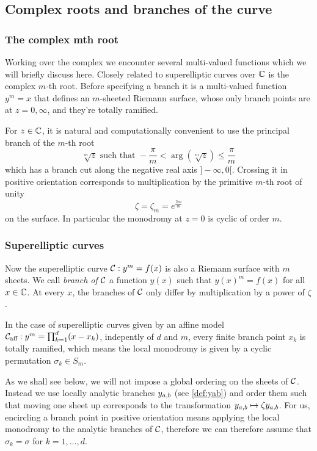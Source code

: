 \documentclass[main.tex]{subfiles}
\begin{document}
  \subsection{Complex roots and branches of the curve}\label{subsec:roots_branches}

  \subsubsection{The complex mth root}

  Working over the complex we encounter several multi-valued functions
  which we will briefly discuss here.  Closely related to superelliptic
  curves over $\mathbb{C}$ is the complex $m$-th root.
  Before specifying a branch it is a multi-valued function $y^m = x$
  that defines an $m$-sheeted Riemann surface, whose only branch points
  are at $z = 0,\infty$, and they're totally ramified.

  For $z\in\mathbb{C}$, it is natural and computationally convenient to use the
  principal branch of the $m$-th root
  \begin{equation}
      \sqrt[m]z \text{ such that } -\frac{π}m<\arg(\sqrt[m]z)\leq\frac{π}m
  \end{equation}
  which has a branch cut along the negative real axis $]\!-\infty,0[$.
  Crossing it in positive orientation corresponds to multiplication by
  the primitive $m$-th root of unity
  \begin{equation}
  \zeta = \zeta_m = e^{\frac{2\pi i }{m}}
  \end{equation}
  on the surface. In
  particular the monodromy at $z=0$ is cyclic of order $m$.

  \subsubsection{Superelliptic curves}

  Now the superelliptic curve $\mathcal{C}:y^m=f(x)$ is also a Riemann surface with
  $m$ sheets.
  We call \emph{branch of $\mathcal{C}$} a function $y(x)$ such that
  $y(x)^m = f(x)$ for all $x \in \mathbb{C}$. At every $x$, the branches of $\mathcal{C}$ only
  differ by multiplication by a power of $\zeta$.


  In the case of superelliptic curves given
  by an affine model $\mathcal{C}_{\text{aff}} : y^m = \prod_{k = 1}^d (x - x_k)$, indepently of
  $d$ and $m$, every finite branch point $x_k$ is totally ramified, which means
  the local monodromy is given by a cyclic permutation $\sigma_k \in S_m$.

  As we shall see below, we
  will not impose a global ordering on the sheets of $\mathcal{C}$. Instead we use
  locally analytic branches $y_{a,b}$ (see \ref{def:yab}) and order them such that
  moving one sheet up corresponds to the transformation $y_{a,b} \mapsto
  \zeta y_{a,b}$. For us, encircling a branch point in positive orientation means
  applying the local monodromy to the analytic branches of $\mathcal{C}$, therefore we
  can therefore assume that $\sigma_k = \sigma$ for $k = 1,\dots,d$.
\end{document}
